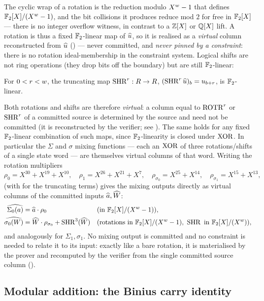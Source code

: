 The cyclic wrap of a rotation is the reduction modulo $X^{w}-1$ that
defines $\mathbb{F}_2[X]/(X^{w}-1)$, and the bit collisions it produces reduce mod $2$ for free
in $\mathbb{F}_2[X]$ --- there is no integer overflow witness, in contrast to a
$\mathbb{Z}[X]$ or $\mathbb{Q}[X]$ lift. A rotation is thus a fixed $\mathbb{F}_2$-linear map of
$\widehat{u}$, so it is realised as a \emph{virtual} column reconstructed from
$\widehat{u}$ () --- never committed, and \emph{never pinned by a
constraint}: there is no rotation ideal-membership in the constraint system.
Logical shifts are not ring operations (they drop bits off the boundary) but
are still $\mathbb{F}_2$-linear:

\begin{lemma}
\label{lem:shr}
For $0<r<w$, the truncating map $\operatorname{SHR}^{r}:R\to R$,
$(\operatorname{SHR}^r \widehat{u})_b = u_{b+r}$, is $\mathbb{F}_2$-linear.
\end{lemma}

Both rotations and shifts are therefore \emph{virtual}: a column equal to
$\operatorname{ROTR}^r$ or $\operatorname{SHR}^r$ of a committed source is determined by the source
and need not be committed (it is reconstructed by the verifier; see
). The same holds for any fixed
$\mathbb{F}_2$-linear combination of such maps, since $\mathbb{F}_2$-linearity is closed
under $\operatorname{XOR}$. In particular the $\Sigma$ and $\sigma$ mixing functions ---
each an $\operatorname{XOR}$ of three rotations/shifts of a single state word --- are
themselves virtual columns of that word. Writing the rotation multipliers
\[
  \rho_{0} = X^{30}+X^{19}+X^{10},\quad
  \rho_{1} = X^{26}+X^{21}+X^{7},\quad
  \rho_{\sigma_0} = X^{25}+X^{14},\quad
  \rho_{\sigma_1} = X^{15}+X^{13},
\]
 (with  for the truncating terms) gives the
mixing outputs directly as virtual columns of the committed inputs
$\widehat{a},\widehat{W}$:
\begin{align}
  \widehat{\Sigma_0(a)} &= \widehat{a}\cdot\rho_0 && (\text{in } \mathbb{F}_2[X]/(X^{w}-1)),
  \label{eq:Sigma}\\
  \widehat{\sigma_0(W)} &= \widehat{W}\cdot\rho_{\sigma_0} + \operatorname{SHR}^{3}(\widehat{W}) && (\text{rotations in } \mathbb{F}_2[X]/(X^{w}-1),\ \operatorname{SHR} \text{ in } \mathbb{F}_2[X]/(X^{w})),
  \label{eq:sigma}
\end{align}
and analogously for $\Sigma_1,\sigma_1$. No mixing output is committed and
no constraint is needed to relate it to its input: exactly like a bare
rotation, it is materialised by the prover and recomputed by the verifier
from the single committed source column ().

\subsection{Modular addition: the Binius carry identity}
\label{sec:add}

